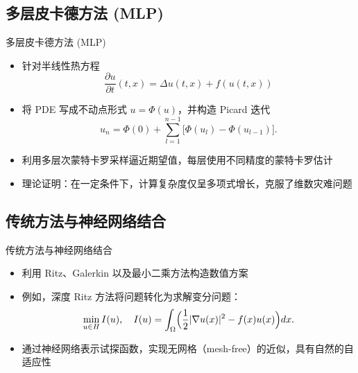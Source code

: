 \documentclass[aspectratio=169]{beamer}
\begin{document}
	\subsection{多层皮卡德方法 (MLP)}
	\begin{frame}{多层皮卡德方法 (MLP)}
		\begin{itemize}
			\item 针对半线性热方程
				\begin{equation*}
				\frac{\partial u}{\partial t}(t,x)=\Delta u(t,x)+f(u(t,x))
				\end{equation*}
			\item 将 PDE 写成不动点形式 \(u = \Phi(u)\)，并构造 Picard 迭代
				\begin{equation*}
				u_n = \Phi(0) + \sum_{l=1}^{n-1} \bigl[\Phi(u_l)-\Phi(u_{l-1})\bigr].
				\end{equation*}
			\item 利用多层次蒙特卡罗采样逼近期望值，每层使用不同精度的蒙特卡罗估计
			\item 理论证明：在一定条件下，计算复杂度仅呈多项式增长，克服了维数灾难问题
		\end{itemize}
	\end{frame}

	\subsection{传统方法与神经网络结合}
	\begin{frame}{传统方法与神经网络结合}
		\begin{itemize}
			\item 利用 Ritz、Galerkin 以及最小二乘方法构造数值方案
			\item 例如，深度 Ritz 方法将问题转化为求解变分问题：
				\begin{equation*}
				\min_{u\in H} I(u),\quad I(u)=\int_\Omega \Bigl(\frac{1}{2}|\nabla u(x)|^2 - f(x)u(x)\Bigr)dx.
				\end{equation*}
			\item 通过神经网络表示试探函数，实现无网格（mesh-free）的近似，具有自然的自适应性
		\end{itemize}
	\end{frame}
\end{document}
